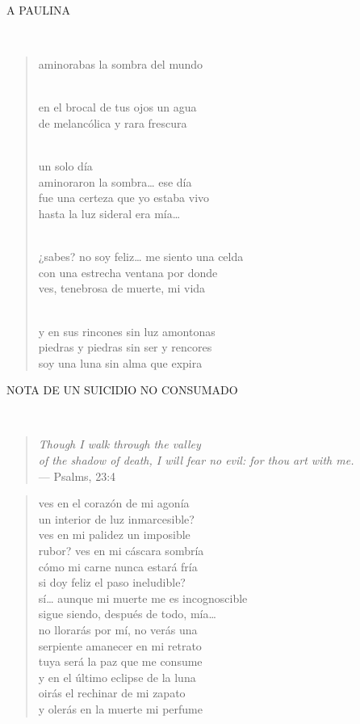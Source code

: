 \documentclass[a4paper, 12pt]{article}
\begin{document}
\centerline{A PAULINA}
~
\begin{verse}
aminorabas la sombra del mundo\\
~ 

en el brocal de tus ojos un agua\\
de melancólica y rara frescura\\
~ 

un solo día\\
aminoraron la sombra… ese día\\
fue una certeza que yo estaba vivo\\
hasta la luz sideral era mía…\\
~ 

¿sabes? no soy feliz… me siento una celda \\
con una estrecha ventana por donde\\
ves, tenebrosa de muerte, mi vida\\
~ 

y en sus rincones sin luz amontonas\\
piedras y piedras sin ser y rencores\\
soy una luna sin alma que expira\\
\end{verse}

\pagebreak

\centerline{NOTA DE UN SUICIDIO NO CONSUMADO}
~
\small
\begin{quote}
\hspace*{\fill}\textit{ Though I walk through the valley\\ \hspace*{\fill}of the shadow of death, 
I will fear no evil: for thou art with me. }\\
\hspace*{\fill}— Psalms, 23:4
\end{quote}

\normalsize
\begin{verse}

ves en el corazón de mi agonía\\
un interior de luz inmarcesible?\\
ves en mi palidez un imposible\\
rubor? ves en mi cáscara sombría\\
cómo mi carne nunca estará fría\\
si doy feliz el paso ineludible?\\
sí… aunque mi muerte me es incognoscible\\
sigue siendo, después de todo, mía…\\
no llorarás por mí, no verás una\\
serpiente amanecer en mi retrato\\
tuya será la paz que me consume\\
y en el último eclipse de la luna\\
oirás el rechinar de mi zapato\\
y olerás en la muerte mi perfume\\
\end{verse}
\end{document}
